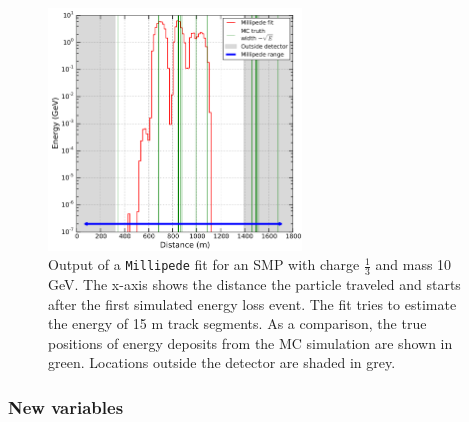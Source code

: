 \begin{figure}[ht]
\centering
\includegraphics[width=0.6\textwidth]{chapter8/img/millipedeStef.png}
\caption{Output of a \texttt{Millipede} fit for an SMP with charge $\frac{1}{3}$ and mass 10 GeV. The x-axis shows the distance the particle traveled and starts after the first simulated energy loss event. The fit tries to estimate the energy of 15 m track segments. As a comparison, the true positions of energy deposits from the MC simulation are shown in green. Locations outside the detector are shaded in grey.}
\label{fig:millipedeoutput}
\end{figure}

\subsubsection{New variables}

